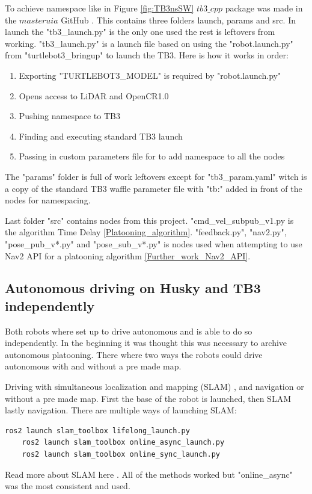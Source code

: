 To achieve namespace like in Figure \ref{fig:TB3nsSW} $tb3\_cpp$ package was made in the $masteruia$ GitHub \cite{masteruia}. This contains three folders launch, params and src. In launch the "tb3\_launch.py" is the only one used the rest is leftovers from working. "tb3\_launch.py" is  a launch file based on using the "robot.launch.py" from "turtlebot3\_bringup" \cite{turtlebot3galactic} to launch the TB3. Here is how it works in order: 
\begin{enumerate}
\item Exporting "TURTLEBOT3\_MODEL" is required by "robot.launch.py" 
\item Opens access to LiDAR and OpenCR1.0 
\item Pushing namespace to TB3 
\item Finding and executing standard TB3 launch
\item Passing in custom parameters file for to add namespace to all the nodes 
\end{enumerate}  

The "params" folder is full of work leftovers except for "tb3\_param.yaml" witch is a copy of the standard TB3 waffle parameter file with "tb:" added in front of the nodes for namespacing.

Last folder "src" contains nodes from this project. "cmd\_vel\_subpub\_v1.py is the algorithm Time Delay \ref{Platooning_algorithm}. "feedback.py", "nav2.py", "pose\_pub\_v*.py" and "pose\_sub\_v*.py" is nodes used when attempting to use Nav2 API for a platooning algorithm \ref{Further_work_Nav2_API}.

\subsection{Autonomous driving on Husky and TB3 independently}
Both robots where set up to drive autonomous and is able to do so independently. In the beginning it was thought this was necessary to archive autonomous platooning. There where two ways the robots could drive autonomous with and without a pre made map. 

Driving with simultaneous localization and mapping (SLAM) , and navigation or without a pre made map. First the base of the robot is launched, then SLAM lastly navigation. There are multiple ways of launching SLAM: 
\begin{lstlisting}[language=bash]
    ros2 launch slam_toolbox lifelong_launch.py 
    ros2 launch slam_toolbox online_async_launch.py
    ros2 launch slam_toolbox online_sync_launch.py
\end{lstlisting}
Read more about SLAM here \cite{slamtoolboxgithub}. All of the methods worked but "online\_async" was the most consistent and used. 

